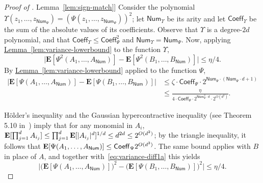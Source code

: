 \documentclass[11pt]{article}
\numberwithin{equation}{section}
\theoremstyle{definition}
\theoremstyle{plain}
\newcommand{\expref}[2]{\hyperref[#2]{#1~\ref{#2}}}
\newcommand{\E}{{\bf E}}
\begin{document}
\begin{proof}[Proof of \expref{Lemma}{lem:sign-match}]
    Consider the polynomial $\Upsilon(z_1, \ldots, z_{\mathsf{Num}_\Psi}) =
    (\Psi(z_1, \ldots, z_{\mathsf{Num}_\Psi}))^2$; let $\mathsf{Num}_\Upsilon$
be its arity and let
$\mathsf{Coeff}_\Upsilon$ be the sum of the absolute values of its
coefficients. Observe that $\Upsilon$ is a degree-$2d$ polynomial, and that
$\mathsf{Coeff}_{\Upsilon} \le \mathsf{Coeff}^2_{\Psi}$ and
$\mathsf{Num}_\Upsilon  = \mathsf{Num}_\Psi$. Now, applying
\expref{Lemma}{lem:variance-lowerbound} to the function $\Upsilon$, %
\begin{equation}\label{eq:variance-diff1}
\big|\mathbf{E} [ \Psi^2(A_1, \ldots, A_{\mathsf{Num}})] -  \mathbf{E} [ \Psi^2(B_1, \ldots, B_{\mathsf{Num}})]  \big| \le \eta/4. 
\end{equation}
By \expref{Lemma}{lem:variance-lowerbound} applied to the function $\Psi$,
\begin{equation}\label{eq:variance-diff1a}
  \begin{split}
  \big|\mathbf{E} [ \Psi(A_1, \ldots, A_{\mathsf{Num}})] -  \mathbf{E} [ \Psi(B_1, \ldots, B_{\mathsf{Num}})]  \big| &\le \zeta \cdot \mathsf{Coeff}_\Psi \cdot 2^{\mathsf{Num}_\Psi \cdot (\mathsf{Num}_\Psi \cdot d+1)}\\ &\le \frac{\eta}{4 \cdot \mathsf{Coeff}_\Psi \cdot 2^{\mathsf{Num}_\Psi^2 \cdot d} \cdot 2^{O(d^3)}}.
\end{split}
\end{equation}

H\"older's inequality and the Gaussian hypercontractive inequality (see Theorem 5.10 in~\cite{Janson:97}) imply that
for any monomial in $A_i$,
$\E [\prod_{j=1}^d A_{i_j}] \le \prod_{j=1}^d \E[|A_{i_j}|^d]^{1/d} \le d^{2d} \le 2^{O(d^2)}$;
by the triangle inequality, it follows that $\E[\Psi(A_1, \dots, A_{\mathsf{Num}})] \le \mathsf{Coeff}_\Psi 2^{O(d^3)}$. The same bound applies with $B$ in place of $A$, and together
with~\eqref{eq:variance-diff1a} this yields
\begin{equation}\label{eq:variance-diff2}
\big|\big(\mathbf{E} [ \Psi(A_1, \ldots, A_{\mathsf{Num}})]\big)^2- \big(\mathbf{E} [ \Psi(B_1, \ldots, B_{\mathsf{Num}})]\big)^2 \big| \le \eta/4. 
\end{equation}


\end{proof}
\end{document}

